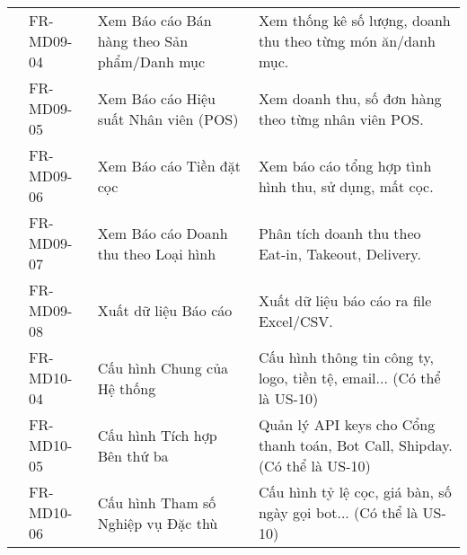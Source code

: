 \begin{longtable}{|m{2.5cm}|m{2.5cm}|m{5cm}|m{5cm}|}
& FR-MD09-04 & Xem Báo cáo Bán hàng theo Sản phẩm/Danh mục & Xem thống kê số lượng, doanh thu theo từng món ăn/danh mục. \\
& FR-MD09-05 & Xem Báo cáo Hiệu suất Nhân viên (POS) & Xem doanh thu, số đơn hàng theo từng nhân viên POS. \\
& FR-MD09-06 & Xem Báo cáo Tiền đặt cọc & Xem báo cáo tổng hợp tình hình thu, sử dụng, mất cọc. \\
& FR-MD09-07 & Xem Báo cáo Doanh thu theo Loại hình & Phân tích doanh thu theo Eat-in, Takeout, Delivery. \\
& FR-MD09-08 & Xuất dữ liệu Báo cáo & Xuất dữ liệu báo cáo ra file Excel/CSV. \\ \cline{2-4}
& FR-MD10-04 & Cấu hình Chung của Hệ thống & Cấu hình thông tin công ty, logo, tiền tệ, email... (Có thể là US-10) \\
& FR-MD10-05 & Cấu hình Tích hợp Bên thứ ba & Quản lý API keys cho Cổng thanh toán, Bot Call, Shipday. (Có thể là US-10) \\
& FR-MD10-06 & Cấu hình Tham số Nghiệp vụ Đặc thù & Cấu hình tỷ lệ cọc, giá bàn, số ngày gọi bot... (Có thể là US-10) \\
\hline


\end{longtable}
